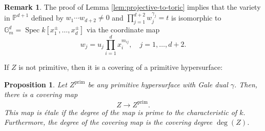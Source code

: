 \documentclass[11pt, reqno]{amsart}
\theoremstyle{plain}
\newtheorem{prop}[theo]{Proposition}
\theoremstyle{definition}
\newtheorem{rem}[theo]{Remark}
\newcommand{\Ps}{\mathbb{P}}
\newcommand{\ga}{\gamma}
\newcommand{\G}{\mathbb{G}}
\newcommand{\Spec}{\operatorname{Spec}}
\begin{document}
\begin{rem}\label{rem:primitive-dehomogenization}
The proof of Lemma \ref{lem:projective-to-toric} implies that the variety in $\Ps^{d+1}$ defined by $w_1\cdots w_{d+2} \neq 0$ 
and $\prod_{j=1}^{d+2} w_j^{\gamma_j} =t$ is isomorphic to $\G_m^{d} = \Spec k[x_1^{\pm},\dots,x_d^{\pm}]$ via the coordinate map
\[
w_j = u_j \prod_{i=1}^{d} x_i^{m_{ij}}, \quad j=1,\dots, d+2.
\]
\end{rem}

If $Z$ is not primitive, then it is a covering of a primitive hypersurface:
\begin{prop}\label{prop:cover}
Let $Z^{\mathrm{prim}}$ be any primitive hypersurface with Gale dual $\ga$. Then, there is a covering map 
\[
Z \to Z^{\mathrm{prim}}.
\]
This map is étale if the degree of the map is prime to the characteristic of $k.$ Furthermore, the degree of the covering map is the covering degree $\deg(Z)$.
\end{prop}
\end{document}
